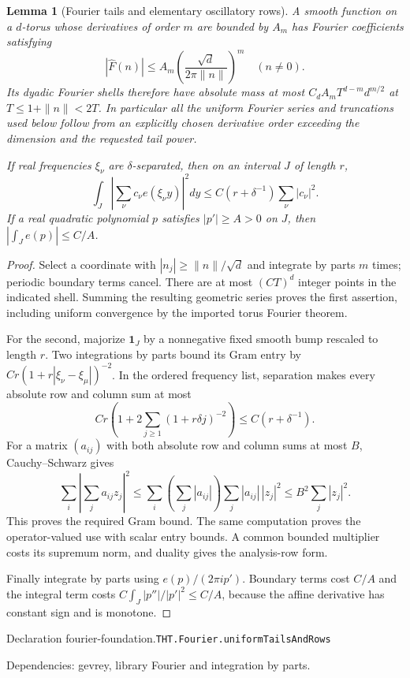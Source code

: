 \documentclass[11pt]{article}
\newtheorem{lemma}[theorem]{Lemma}
\theoremstyle{definition}
\newcommand{\one}{\mathbf 1}
\numberwithin{equation}{section}
\newcommand{\bp}[3]{\par\smallskip\begingroup\footnotesize
\noindent\hypertarget{bp:#1}{\textsf{Declaration #1.}}\quad\nolinkurl{#2}\par
\noindent\textsf{Dependencies:} #3.\par\endgroup\smallskip}
\begin{document}
\begin{lemma}[Fourier tails and elementary oscillatory rows]\label{lem:fourier-foundation}
A smooth function on a $d$-torus whose derivatives of order $m$ are bounded by $A_m$ has Fourier coefficients satisfying
\[
 |\widehat F(n)|\le A_m\left(\frac{\sqrt d}{2\pi\|n\|}\right)^m\quad(n\ne0).
\]
Its dyadic Fourier shells therefore have absolute mass at most $C_d A_m T^{d-m}d^{m/2}$ at $T\le1+\|n\|<2T$. In particular all the uniform Fourier series and truncations used below follow from an explicitly chosen derivative order exceeding the dimension and the requested tail power.

If real frequencies $\xi_\nu$ are $\delta$-separated, then on an interval $J$ of length $r$,
\[
 \int_J\left|\sum_\nu c_\nu e(\xi_\nu y)\right|^2dy
 \le C(r+\delta^{-1})\sum_\nu|c_\nu|^2.
\]
If a real quadratic polynomial $p$ satisfies $|p'|\ge A>0$ on $J$, then $|\int_J e(p)|\le C/A$.
\end{lemma}
\begin{proof}
Select a coordinate with $|n_j|\ge\|n\|/\sqrt d$ and integrate by parts $m$ times; periodic boundary terms cancel. There are at most $(CT)^d$ integer points in the indicated shell. Summing the resulting geometric series proves the first assertion, including uniform convergence by the imported torus Fourier theorem.

For the second, majorize $\one_J$ by a nonnegative fixed smooth bump rescaled to length $r$. Two integrations by parts bound its Gram entry by $Cr(1+r|\xi_\nu-\xi_\mu|)^{-2}$. In the ordered frequency list, separation makes every absolute row and column sum at most
\[
 Cr\left(1+2\sum_{j\ge1}(1+r\delta j)^{-2}\right)\le C(r+\delta^{-1}).
\]
For a matrix $(a_{ij})$ with both absolute row and column sums at most $B$, Cauchy--Schwarz gives
\[
 \sum_i\left|\sum_j a_{ij}z_j\right|^2
 \le\sum_i\left(\sum_j|a_{ij}|\right)\sum_j|a_{ij}|\,|z_j|^2
 \le B^2\sum_j|z_j|^2.
\]
This proves the required Gram bound. The same computation proves the operator-valued use with scalar entry bounds. A common bounded multiplier costs its supremum norm, and duality gives the analysis-row form.

Finally integrate by parts using $e(p)/(2\pi i p')$. Boundary terms cost $C/A$ and the integral term costs $C\int_J |p''|/|p'|^2\le C/A$, because the affine derivative has constant sign and is monotone.
\end{proof}
\bp{fourier-foundation}{THT.Fourier.uniformTailsAndRows}{gevrey, library Fourier and integration by parts}
\end{document}
